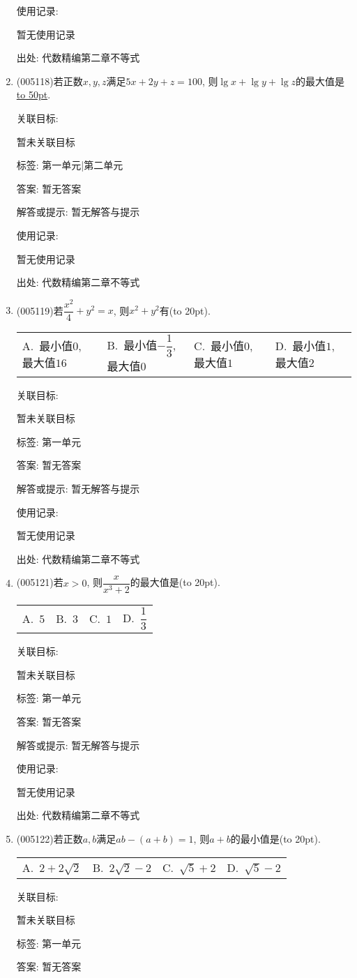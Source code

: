 \documentclass[10pt,a4paper]{article}
\newcommand{\blank}[1]{\underline{\hbox to #1pt{}}}
\newcommand{\bracket}[1]{(\hbox to #1pt{})}
\newcommand{\fourch}[4]{\par\begin{tabular}{p{.23\textwidth}p{.23\textwidth}p{.23\textwidth}p{.23\textwidth}}
A.~#1 &B.~#2& C.~#3& D.~#4
\end{tabular}}
\begin{document}
\begin{enumerate}[1.]
使用记录:

暂无使用记录


出处: 代数精编第二章不等式
\item { (005118)}若正数$x,y,z$满足$5x+2y+z=100$, 则$\lg x+\lg y+\lg z$的最大值是\blank{50}.


关联目标:

暂未关联目标



标签: 第一单元|第二单元

答案: 暂无答案

解答或提示: 暂无解答与提示

使用记录:

暂无使用记录


出处: 代数精编第二章不等式
\item { (005119)}若$\dfrac{x^2}4+{y^2}=x$, 则$x^2+y^2$有\bracket{20}.
\fourch{最小值$0$, 最大值$16$}{最小值$-\dfrac 13$, 最大值$0$}{最小值$0$, 最大值$1$}{最小值$1$, 最大值$2$}


关联目标:

暂未关联目标



标签: 第一单元

答案: 暂无答案

解答或提示: 暂无解答与提示

使用记录:

暂无使用记录


出处: 代数精编第二章不等式
\item { (005121)}若$x>0$, 则$\dfrac x{x^3+2}$的最大值是\bracket{20}.
\fourch{$5$}{$3$}{$1$}{$\dfrac 13$}


关联目标:

暂未关联目标



标签: 第一单元

答案: 暂无答案

解答或提示: 暂无解答与提示

使用记录:

暂无使用记录


出处: 代数精编第二章不等式
\item { (005122)}若正数$a,b$满足$ab-(a+b)=1$, 则$a+b$的最小值是\bracket{20}.
\fourch{$2+2\sqrt 2$}{$2\sqrt 2-2$}{$\sqrt 5+2$}{$\sqrt 5-2$}


关联目标:

暂未关联目标



标签: 第一单元

答案: 暂无答案


\end{enumerate}
\end{document}

